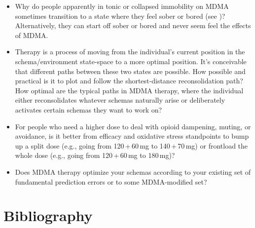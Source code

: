 \documentclass[11pt,oneside]{book}
\begin{document}
\begin{itemize}
    \item Why do people apparently in tonic or collapsed immobility on MDMA sometimes transition to a state where they feel sober or bored (see \textcite{razviDissociation})? Alternatively, they can start off sober or bored and never seem feel the effects of MDMA.
    \item Therapy is a process of moving from the individual's current position in the schema/environment state-space to a more optimal position. It's conceivable that different paths between these two states are possible. How possible and practical is it to plot and follow the shortest-distance reconsolidation path? How optimal are the typical paths in MDMA therapy, where the individual either reconsolidates whatever schemas naturally arise or deliberately activates certain schemas they want to work on?
    \item For people who need a higher dose to deal with opioid dampening, muting, or avoidance, is it better from efficacy and oxidative stress standpoints to bump up a split dose (e.g., going from 120\,+\,60\,mg to 140\,+\,70\,mg) or frontload the whole dose (e.g., going from 120\,+\,60\,mg to 180\,mg)?
    \item Does MDMA therapy optimize your schemas according to your existing set of fundamental prediction errors or to some MDMA-modified set?
\end{itemize}

\backmatter

\chapter*{Bibliography}
\printbibliography[heading=none]
\end{document}
